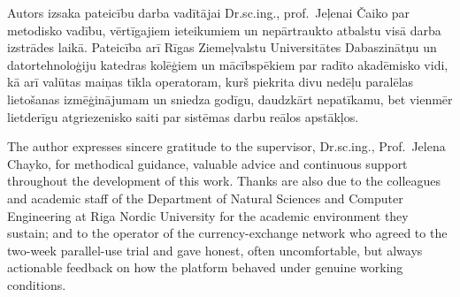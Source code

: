 \frontmatterpage
{}
Autors izsaka pateicību darba vadītājai Dr.sc.ing., prof.\ Jeļenai Čaiko par metodisko vadību, vērtīgajiem ieteikumiem un nepārtraukto atbalstu visā darba izstrādes laikā. Pateicība arī Rīgas Ziemeļvalstu Universitātes Dabaszinātņu un datortehnoloģiju katedras kolēģiem un mācībspēkiem par radīto akadēmisko vidi, kā arī valūtas maiņas tīkla operatoram, kurš piekrita divu nedēļu paralēlas lietošanas izmēģinājumam un sniedza godīgu, daudzkārt nepatīkamu, bet vienmēr lietderīgu atgriezenisko saiti par sistēmas darbu reālos apstākļos.

\vspace{6mm}
The author expresses sincere gratitude to the supervisor, Dr.sc.ing., Prof.\ Jelena Chayko, for methodical guidance, valuable advice and continuous support throughout the development of this work. Thanks are also due to the colleagues and academic staff of the Department of Natural Sciences and Computer Engineering at Riga Nordic University for the academic environment they sustain; and to the operator of the currency-exchange network who agreed to the two-week parallel-use trial and gave honest, often uncomfortable, but always actionable feedback on how the platform behaved under genuine working conditions.
